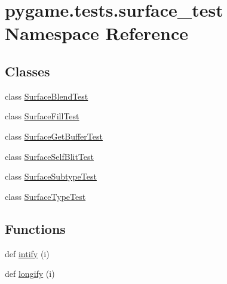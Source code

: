 \hypertarget{namespacepygame_1_1tests_1_1surface__test}{}\section{pygame.\+tests.\+surface\+\_\+test Namespace Reference}
\label{namespacepygame_1_1tests_1_1surface__test}
\subsection*{Classes}
\begin{DoxyCompactItemize}
\item 
class \hyperlink{classpygame_1_1tests_1_1surface__test_1_1_surface_blend_test}{Surface\+Blend\+Test}
\item 
class \hyperlink{classpygame_1_1tests_1_1surface__test_1_1_surface_fill_test}{Surface\+Fill\+Test}
\item 
class \hyperlink{classpygame_1_1tests_1_1surface__test_1_1_surface_get_buffer_test}{Surface\+Get\+Buffer\+Test}
\item 
class \hyperlink{classpygame_1_1tests_1_1surface__test_1_1_surface_self_blit_test}{Surface\+Self\+Blit\+Test}
\item 
class \hyperlink{classpygame_1_1tests_1_1surface__test_1_1_surface_subtype_test}{Surface\+Subtype\+Test}
\item 
class \hyperlink{classpygame_1_1tests_1_1surface__test_1_1_surface_type_test}{Surface\+Type\+Test}
\end{DoxyCompactItemize}
\subsection*{Functions}
\begin{DoxyCompactItemize}
\item 
def \hyperlink{namespacepygame_1_1tests_1_1surface__test_a7c68e5fb86ee15fdeb5efc7dc6184db0}{intify} (i)
\item 
def \hyperlink{namespacepygame_1_1tests_1_1surface__test_a1c8d5e704ef5593788e3abbd091f92b2}{longify} (i)
\end{DoxyCompactItemize}
